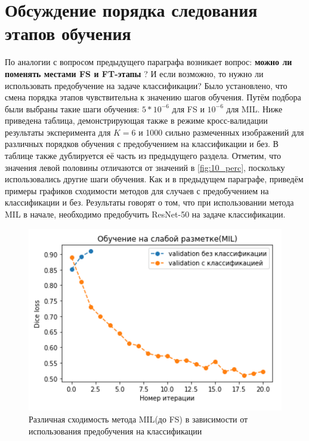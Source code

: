 \section{Обсуждение порядка следования этапов обучения}
По аналогии с вопросом предыдущего параграфа  возникает вопрос:  {\bf можно ли поменять местами FS и FT-этапы} ? И если возможно, то нужно ли использовать предобучение на задаче классификации? Было установлено, что смена порядка этапов чувствительна к значению шагов обучения. Путём подбора были выбраны такие шаги обучения: $5*10^{-6}$ для FS и $10^{-6}$ для MIL. Ниже приведена таблица, демонстрирующая также в режиме кросс-валидации результаты эксперимента для $K = 6$ и 1000 сильно размеченных изображений для различных порядков обучения с предобучением на классификации и без. В таблице также дублируется её часть из предыдущего раздела. Отметим, что значения левой половины отличаются от значений  в \ref{fig:10_perc}, поскольку использовались другие шаги обучения.  Как и в предыдущем параграфе, приведём примеры графиков сходимости методов для случаев с предобучением на классификации и без. Результаты говорят о том, что при использовании метода MIL в начале, необходимо предобучить ResNet-50 на задаче классификации.


\begin{figure}[h!] 
  \center
  \includegraphics [scale=0.45] {images/cmp_order_mil.png}
  \caption{ Различная сходимость метода MIL(до FS) в зависимости от использования предобучения на классификации }
  \label{fig:mil_order}  
\end{figure}

